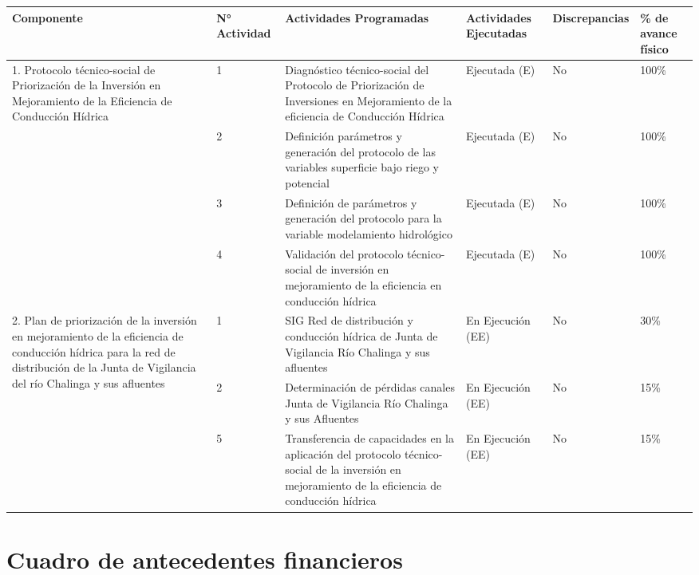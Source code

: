\documentclass[]{article}
\begin{document}
\begin{table}[!htb]
\centering
\resizebox{16cm}{!} {
\begin{tabular}{|p{3cm}|p{2cm}|p{3cm}|p{2.5cm}|p{2.5cm}|p{2cm}|}
    \hline
    \textbf{Componente} & \textbf{N° Actividad} & \textbf{Actividades Programadas} & \textbf{Actividades Ejecutadas} & \textbf{Discrepancias} & \textbf{\% de avance físico}\\
    \hline
    \multirow {4}{3cm}{1. Protocolo técnico-social de Priorización de la Inversión en Mejoramiento de la Eficiencia de Conducción Hídrica} & 1 & 		Diagnóstico técnico-social del Protocolo de Priorización de Inversiones en Mejoramiento de la eficiencia de Conducción Hídrica &  Ejecutada (E)  & No & 100\%\\
    \cline{2-6}
    & 2 & Definición parámetros y generación del protocolo de las variables superficie bajo riego y potencial & Ejecutada (E) & No & 100\%\\
    \cline{2-6}
    & 3 & Definición de parámetros y generación del protocolo para la variable modelamiento hidrológico & Ejecutada (E)  & No & 100\%\\
    \cline{2-6}
    & 4 & Validación del protocolo técnico-social de inversión en mejoramiento de la eficiencia en conducción hídrica & Ejecutada (E)  & No & 100\%\\
    \hline
    \multirow {3}{3cm}{2. Plan de priorización de la inversión en mejoramiento de la eficiencia de conducción hídrica para la red de distribución de la Junta de Vigilancia del río Chalinga y sus afluentes} & 		1 & 		SIG Red de distribución y conducción hídrica de Junta de Vigilancia Río Chalinga y sus afluentes & En Ejecución (EE)      		& No & 30\%\\ \cline{2-6}
    & 2 & Determinación de pérdidas canales Junta de Vigilancia Río Chalinga y sus Afluentes & En Ejecución (EE)      		& No & 15\%\\ \cline{2-6}
    & 5 & Transferencia de capacidades en la aplicación del protocolo técnico-social de la inversión en mejoramiento de la eficiencia de conducción hídrica & En Ejecución (EE)      		& No & 15\%\\
    \hline
   
\end{tabular}
}
\end{table}

\clearpage
\section{Cuadro de antecedentes financieros}
\end{document}

